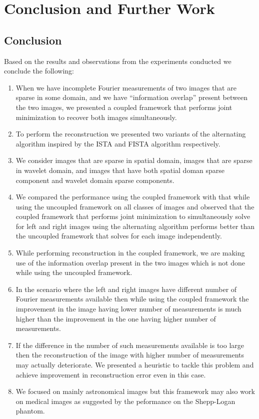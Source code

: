 \chapter{Conclusion and Further Work}
\section{Conclusion}
Based on the results and observations from the experiments conducted we conclude the following:
\begin{enumerate}
\item When we have incomplete Fourier measurements of two images that are sparse in some domain, and we have ``information overlap'' present between the two images, we presented a coupled framework that performs joint minimization to recover both images simultaneously.
\item To perform the reconstruction we presented two variants of the alternating algorithm inspired by the ISTA and FISTA algorithm respectively.
\item We consider images that are sparse in spatial domain, images that are sparse in wavelet domain, and images that have both spatial doman sparse component and wavelet domain sparse components. 
\item We compared the performance using the coupled framework with that while using the uncoupled framework on all classes of images and observed that the coupled framework that performs joint minimization to simultaneously solve for left and right images using the alternating algorithm performs better than the uncoupled framework that solves for each image independently.
\item While performing reconstruction in the coupled framework, we are making use of the information overlap present in the two images which is not done while using the uncoupled framework.
\item In the scenario where the left and right images have different number of Fourier measurements available then while using the coupled framework the improvement in the image having lower number of measurements is much higher than the improvement in the one having higher number of measurements.
\item If the difference in the number of such measurements available is too large then the reconstruction of the image with higher number of measurements may actually deteriorate. We presented a heuristic to tackle this problem and achieve improvement in reconstruction error even in this case.
\item We focused on mainly astronomical images but this framework may also work on medical images as suggested by the peformance on the Shepp-Logan phantom.

\end{enumerate}

